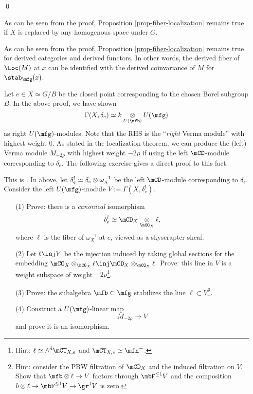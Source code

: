 	\qed

	\begin{rem}
		As can be seen from the proof, Proposition \ref{prop-fiber-localization} remains true if $X$ is replaced by any homogenous space under $G$.
	\end{rem}

	\begin{rem}
		As can be seen from the proof, Proposition \ref{prop-fiber-localization} remains true for derived categories and derived functors. In other words, the derived fiber of $\Loc(M)$ at $x$ can be identified with the derived coinvariance of $M$ for $\stab_\mfg(x)$.

	\end{rem}

	Let $e\in X \simeq G/B$ be the closed point corresponding to the chosen Borel subgroup $B$. In the above proof, we have shown
	\[
		 \Gamma(X, \delta_e ) \simeq k\ot_{U(\mfb)} U(\mfg)
	\]
	as right $U(\mfg)$-modules. Note that the RHS is the ``\emph{right} Verma module'' with highest weight $0$. As stated in the localization theorem, we can produce the (left) Verma module $M_{-2\rho}$ with highest weight $-2\rho$ if using the left $\mCD$-module corresponding to $\delta_e$. The following exercise gives a direct proof to this fact.

	\begin{exe}
		\label{exe-delta-Verma-2rho}
		This is . 
		In above, let $\delta_e^l\simeq \delta_e\ot \omega_{X}^{-1}$ be the left $\mCD$-module corresponding to $\delta_e$. Consider the left $U(\mfg)$-module $V:=\Gamma(X, \delta_e^l)$.
		
		\begin{itemize}
			\item[(1)]
				Prove: there is a \emph{canonical} isomorphism
				\[
					\delta_e^l \simeq \mCD_{X} \ot_{\mCO_{X}} \ell,
				\]
				where $\ell$ is the fiber of $\omega_{X}^{-1}$ at $e$, viewed as a skyscrapter sheaf.
			\item[(2)]
				Let $ \ell \inj V$ be the injection induced by taking global sections for the embedding $\mCO_{X} \ot_{\mCO_{X}} \ell \inj \mCD_{X} \ot_{\mCO_{X}}\ell$. Prove: this line in $V$ is a weight subspace of weight $-2\rho$\footnote{Hint: $\ell \simeq \wedge^d \mCT_{X,e} $ and $\mCT_{X,e}\simeq \mfn^-$.}.
			\item[(3)]
				Prove: the subalgebra $\mfb \subset \mfg$ stabilizes the line $\ell\subset V$\footnote{Hint: consider the PBW filtration of $\mCD_X$ and the induced filtration on $V$. Show that $\mfb \ot \ell \to V$ factors through $\mbF^{\le 1} V$ and the composition $b\ot \ell \to \mbF^{\le 1} V \to \gr^1 V$ is zero.}.
			\item[(4)]
				Construct a $U(\mfg)$-linear map 
				\[
					M_{-2\rho} \to V
				\]
				and prove it is an isomorphism.
		\end{itemize}

	\end{exe}



